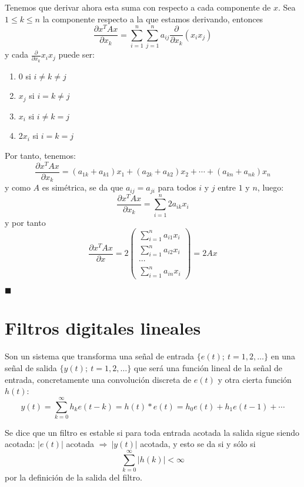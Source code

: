 Tenemos que derivar ahora esta suma con respecto a cada componente de $x$. Sea $1 \leq k \leq n$ la componente respecto a la que estamos derivando, entonces 
\[	\frac{\partial x^TAx}{\partial x_k} = \sum_{i=1}^n \sum_{j=1}^n a_{ij} \frac{\partial}{\partial x_k} (x_ix_j)	\]
y cada $\frac{\partial}{\partial x_k} x_ix_j$ puede ser:
\begin{enumerate}
\item 0 si $i \neq k \neq j$
\item $x_j$ si $i = k \neq j$
\item $x_i$ si $ i \neq k = j$
\item $2x_i$ si $i = k = j$
\end{enumerate}

Por tanto, tenemos:
\[	\frac{\partial x^TAx}{\partial x_k} = (a_{1k} + a_{k1})x_1 + (a_{2k} + a_{k2})x_2 + \cdots + (a_{kn}+a_{nk})x_n	\]
y como $A$ es simétrica, se da que $a_{ij} = a_{ji}$ para todos $i$ y $j$ entre $1$ y $n$, luego:
\[	\frac{\partial x^TAx}{\partial x_k} = \sum_{i=1}^n 2a_{ik}x_i	\]
y por tanto
\[	\frac{\partial x^TAx}{\partial x} = 2
\left( \begin{array}{c}
\sum_{i=1}^n a_{i1}x_i \\
\sum_{i=1}^n a_{i2}x_i \\
\cdots \\
\sum_{i=1}^n a_{in}x_i \end{array} \right) = 2Ax	\]
\begin{flushright}
$\blacksquare$
\end{flushright}

\section{Filtros digitales lineales}

Son un sistema que transforma una señal de entrada $\{e(t);\ t=1,2,\dots\}$ en una señal de salida $\{y(t);\ t=1,2,\dots \}$ que será una función lineal de la señal de entrada, concretamente una convolución discreta de $e(t)$ y otra cierta función $h(t)$:
\[	y(t) = \sum_{k=0}^{\infty} h_k e(t-k) = h(t) \ast e(t) = h_0 e(t) + h_1 e(t-1) + \cdots	\]

\begin{definicion}
Se dice que un filtro es estable si para toda entrada acotada la salida sigue siendo acotada: $|e(t)|$ acotada $\Rightarrow \ |y(t)|$ acotada, y esto se da si y sólo si
\[ \sum_{k=0}^{\infty} |h(k)| < \infty 	\]
por la definición de la salida del filtro.
\end{definicion}

